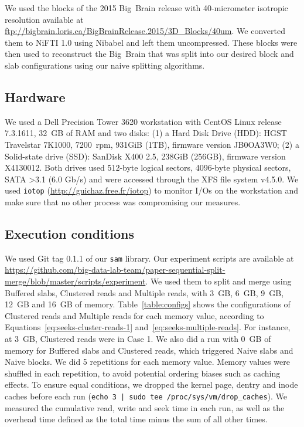 \documentclass[10pt, conference, compsocconf]{IEEEtran}
\begin{document}
We used the blocks of the 2015 Big~Brain release with 40-micrometer
isotropic resolution available at
\url{ftp://bigbrain.loris.ca/BigBrainRelease.2015/3D\_Blocks/40um}. We
converted them to NiFTI 1.0 using Nibabel and left them uncompressed.
These blocks were then used to reconstruct the Big~Brain that was split into our desired block and slab
configurations using our naive splitting algorithms. 

\subsection{Hardware}
We used a Dell Precision Tower 3620 workstation with CentOS Linux
release 7.3.1611, 32~GB of RAM and two disks: (1) a Hard Disk Drive
(HDD): HGST Travelstar 7K1000, 7200~rpm, 931GiB (1TB), firmware
version JB0OA3W0; (2) a Solid-state drive (SSD): SanDisk X400 2.5,
238GiB (256GB), firmware version X4130012.  Both drives used 512-byte
logical sectors, 4096-byte physical sectors, SATA \textgreater 3.1 (6.0 Gb/s) and
were accessed through the XFS file system v4.5.0. We used
\texttt{iotop} (\url{http://guichaz.free.fr/iotop}) to monitor I/Os on
the workstation and make sure that no other process was compromising
our measures.

\subsection{Execution conditions}

We used Git tag 0.1.1 of our \texttt{sam} library. Our
experiment scripts are available at
\url{https://github.com/big-data-lab-team/paper-sequential-split-merge/blob/master/scripts/experiment}. We
used them to split and merge using Buffered slabs, Clustered reads and
Multiple reads, with 3~GB, 6~GB, 9~GB, 12~GB and 16~GB of
memory. Table~\ref{table:configs} shows the configurations of Clustered
reads and Multiple reads for each memory value, according to
Equations~\ref{eq:seeks-cluster-reads-1}
and~\ref{eq:seeks-multiple-reads}. For instance, at 3~GB, Clustered reads were in
Case 1. We also did a run with 0~GB of memory for Buffered slabs and
Clustered reads, which triggered Naive slabs and Naive blocks. We did 5
repetitions for each memory value. Memory values were shuffled in each
repetition, to avoid potential ordering biases such
as caching effects. To ensure equal conditions, we dropped the kernel
page, dentry and inode caches before each run (\texttt{echo 3 | sudo
  tee /proc/sys/vm/drop\_caches}). We measured the cumulative read,
write and seek time in each run, as well as the overhead time defined
as the total time minus the sum of all other times.
\end{document}
